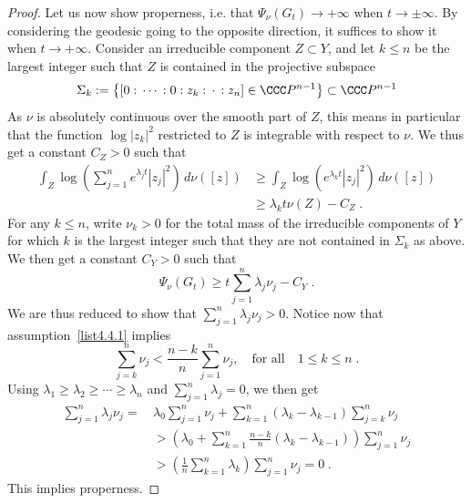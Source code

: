 \begin{proof}
Let us now show properness, i.e. that $\Psi_\nu(G_t)\to+\infty$ when $t\to\pm\infty$. By considering the geodesic going to the opposite direction, it suffices to show it when $t\to+\infty$. Consider an irreducible component $Z\subset Y$, and let $k\leq n$ be the largest integer such that $Z$ is contained in the projective subspace
\begin{equation}\label{Sigmak}
\Sigma_k:=\left\{[0:\,\cdots\,:0:z_k:\,\cdot\,:z_n]\in\CCC P^{n-1}\right\}\subset\CCC P^{n-1}
\end{equation}
As $\nu$ is absolutely continuous over the smooth part of $Z$, this means in particular that the function $\log|z_k|^2$ restricted to $Z$ is integrable with respect to $\nu$. We thus get a constant $C_Z>0$ such that
\begin{equation}
\begin{split}
\int_Z\log\left(\sum_{j=1}^ne^{\lambda_j t} |z_j|^2\right)\,d\nu([z])&\geq\int_Z\log\left(e^{\lambda_k t} |z_j|^2\right)\,d\nu([z])\\
&\geq\lambda_k t\nu(Z)-C_Z\;.
\end{split}
\end{equation}
For any $k\leq n$, write $\nu_k>0$ for the total mass of the irreducible components of $Y$ for which $k$ is the largest integer such that they are not contained in $\Sigma_k$ as above. We then get a constant $C_Y>0$ such that
\begin{equation}
\Psi_\nu(G_t)\geq t\sum_{j=1}^n\lambda_j\nu_j-C_Y\;.
\end{equation}
We are thus reduced to show that $\sum_{j=1}^n\lambda_j\nu_j>0$. Notice now that assumption~\eqref{list4.4.1} implies
\begin{equation}
\sum_{j=k}^n\nu_j<\frac{n-k}{n}\sum_{j=1}^n\nu_j,
\quad\text{for all}\quad 1\leq k\leq n\;.
\end{equation}
Using $\lambda_1\geq\lambda_2\geq\cdots\geq\lambda_n$ and $\sum_{j=1}^n\lambda_j=0$, we then get
\begin{equation}
\begin{split}
\sum_{j=1}^n\lambda_j\nu_j=\,&\lambda_0\sum_{j=1}^n\nu_j+
\sum_{k=1}^n(\lambda_k-\lambda_{k-1})\sum_{j=k}^n\nu_j\\
&>\left(\lambda_0+\sum_{k=1}^n\frac{n-k}{n} (\lambda_k-\lambda_{k-1})\right)\sum_{j=1}^n\nu_j\\
&>\left(\frac{1}{n}
\sum_{k=1}^n\lambda_k\right)\sum_{j=1}^n\nu_j=0\;.
\end{split}
\end{equation}
This implies properness.


\end{proof}
